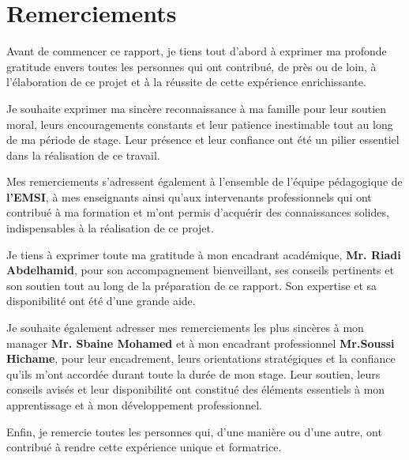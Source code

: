 \chapter*{Remerciements}
\justifying
Avant de commencer ce rapport, je tiens tout d'abord à exprimer ma profonde gratitude envers toutes les personnes qui ont contribué, de près ou de loin, à l'élaboration de ce projet et à la réussite de cette expérience enrichissante.

Je souhaite exprimer ma sincère reconnaissance à ma famille pour leur soutien moral, leurs encouragements constants et leur patience inestimable tout au long de ma période de stage. Leur présence et leur confiance ont été un pilier essentiel dans la réalisation de ce travail.

Mes remerciements s'adressent également à l'ensemble de l'équipe pédagogique de \textbf{l'EMSI}, à mes enseignants ainsi qu'aux intervenants professionnels qui ont contribué à ma formation et m'ont permis d'acquérir des connaissances solides, indispensables à la réalisation de ce projet.

Je tiens à exprimer toute ma gratitude à mon encadrant académique, \textbf{Mr. Riadi Abdelhamid}, pour son accompagnement bienveillant, ses conseils pertinents et son soutien tout au long de la préparation de ce rapport. Son expertise et sa disponibilité ont été d'une grande aide.

Je souhaite également adresser mes remerciements les plus sincères à mon manager \textbf{Mr. Sbaine Mohamed} et à mon encadrant professionnel \textbf{Mr.Soussi Hichame}, pour leur encadrement, leurs orientations stratégiques et la confiance qu'ils m'ont accordée durant toute la durée de mon stage. Leur soutien, leurs conseils avisés et leur disponibilité ont constitué des éléments essentiels à mon apprentissage et à mon développement professionnel.

Enfin, je remercie toutes les personnes qui, d'une manière ou d'une autre, ont contribué à rendre cette expérience unique et formatrice.
